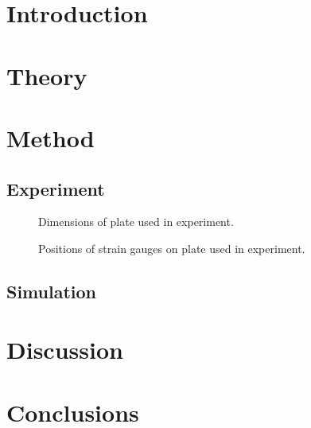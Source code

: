 \documentclass[a4paper,11pt,twocolumn]{article}
\begin{document}


\printnomenclature

\section{Introduction}
\section{Theory}
\section{Method}
\subsection{Experiment}

\begin{figure}[h] \label{fig:experiment_dims}
    \def\svgwidth{0.48\textwidth}
    
    \caption{Dimensions of plate used in experiment.}
\end{figure}
\begin{figure}[h] \label{fig:experiment_gauges}
    \def\svgwidth{0.48\textwidth}
    
    \caption{Positions of strain gauges on plate used in experiment.}
\end{figure}

\subsection{Simulation}
\section{Discussion}
\section{Conclusions}

\printbibliography
\end{document}
